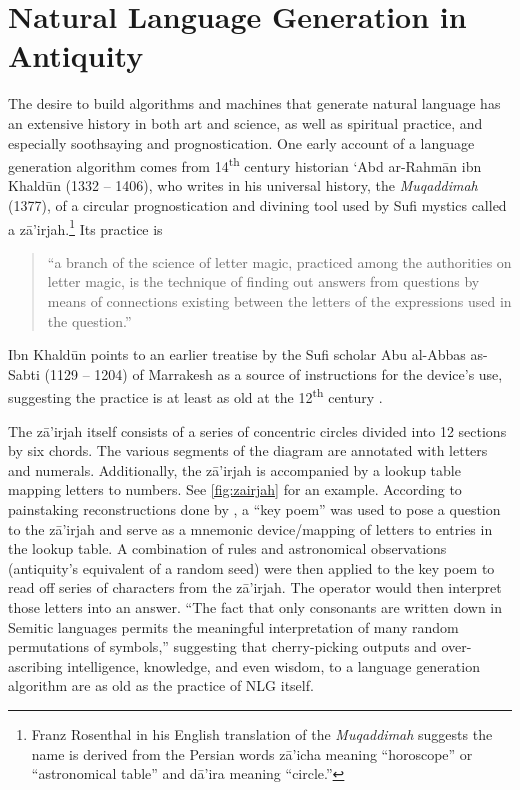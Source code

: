 \section{Natural Language Generation in Antiquity}
 
The desire to build algorithms and machines that generate natural language has
an extensive history in both art and science, as well as spiritual practice,
and especially soothsaying and prognostication.  One early account of a
language generation algorithm comes from 14\textsuperscript{th} century
historian `Abd ar-Rahm\={a}n ibn Khald\={u}n (1332 -- 1406), who writes in his
universal history, the \textit{Muqaddimah} (1377), of a circular
prognostication and divining tool  used by Sufi mystics called a
z\={a}'irjah.\footnote{Franz Rosenthal in his English translation of the
    \textit{Muqaddimah} suggests the name is derived from the Persian words
    z\={a}'icha meaning ``horoscope'' or  ``astronomical table'' and
d\={a}'ira meaning ``circle.''} Its practice is \begin{quote} ``a branch of
    the science of letter magic, practiced among the authorities on letter
    magic, is the technique of finding out answers from questions by means of
connections existing between the letters of the expressions used in the
question.''\end{quote}

Ibn Khald\={u}n points to an earlier treatise by the Sufi scholar Abu al-Abbas
as-Sabti (1129 -- 1204) of Marrakesh as a source of instructions for the
device's use, suggesting the practice is at least as old at the
12\textsuperscript{th} century \citep{rosenthal1958muqaddimah}.


 
The z\={a}'irjah itself consists of a series of concentric circles divided
into 12 sections by six chords. The various segments of the diagram are
annotated with letters and numerals. Additionally, the z\={a}'irjah is
accompanied by a lookup table mapping letters to numbers. See
\autoref{fig:zairjah} for an example. According to painstaking reconstructions
done by \cite{link2010variantology}, a ``key poem'' was used to pose a
question to the z\={a}'irjah and serve as a mnemonic device/mapping of letters
to entries in the lookup table.  A combination of rules and astronomical
observations (antiquity's equivalent of a random seed) were then applied to
the key poem to read off series of characters from the z\={a}'irjah. The
operator would then interpret those letters into an answer.  ``The fact that
only consonants are written down in Semitic languages permits the meaningful
interpretation of many random permutations of symbols,''
\citep{link2010variantology} suggesting that cherry-picking outputs and
over-ascribing intelligence, knowledge, and even wisdom, to a language
generation algorithm are as old as the practice of NLG itself.
  
